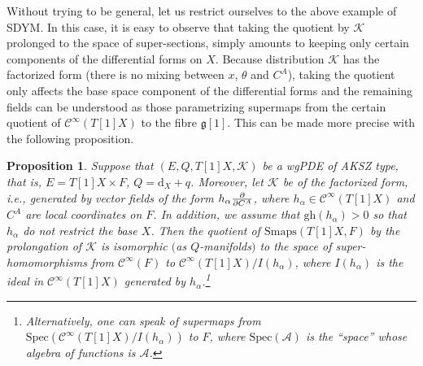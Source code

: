 \documentclass[pdftex]{sigma}
\numberwithin{equation}{section}
\newtheorem{Proposition}[Theorem]{Proposition}
\theoremstyle{definition}
\newcommand{\gh}[1]{\mathrm{gh}(#1)}
\newcommand{\dx}{\mathrm{d}_X}
\renewcommand{\d}{\partial}
\newcommand{\ffrac}[2]{\raisebox{.5pt}%
 {\footnotesize$\displaystyle\frac{#1}{#2}$}\kern1pt}
\newcommand{\dl}[1]{\mathchoice{\ffrac{\d}{\d #1}}{\frac{\d}{\d #1}}{\ffrac{\d}{\d #1}}{\ffrac{\d}{\d #1}}}
\newcommand{\Liealg}{\mathfrak}
\newcommand{\algg}{\Liealg{g}}
\newcommand{\algA}{\mathcal{A}}
\newcommand{\cC}{\mathcal{C}}
\def\cK{\mathcal{K}}
\begin{document}
Without trying to be general, let us restrict ourselves to the above example of SDYM. In this case, it is easy to observe that taking the quotient by $\cK$ prolonged to the space of super-sections, simply amounts to keeping only certain components of the differential forms on $X$. Because distribution $\cK$ has the factorized form \big(there is no mixing between $x$, $\theta$ and $C^A$\big), taking the quotient only affects the base space component of the differential forms and the remaining fields can be understood as those parametrizing supermaps from the certain quotient of $\cC^\infty(T[1]X)$ to the fibre $\algg[1]$. This can be made more precise with the following proposition.

\begin{Proposition}
Suppose that $(E,Q,T[1]X,\cK)$ be a wgPDE of AKSZ type, that is, $E=T[1]X\times F$, $Q=\dx+q$. Moreover, let $\cK$ be of the factorized form, i.e., generated by vector fields of the form
$h_\alpha\dl{C^A}$, where $h_\alpha\in \cC^\infty(T[1]X)$ and $C^A$ are local coordinates on $F$. In addition, we assume that $\gh{h_\alpha}>0$ so that $h_\alpha$ do not restrict the base $X$. Then the quotient of $\mathrm{Smaps}(T[1]X,F)$ by the prolongation of $\cK$ is isomorphic $($as $Q$-manifolds$)$ to the space of super-homomorphisms from $\cC^\infty(F)$ to $\cC^\infty(T[1]X)/I(h_\alpha)$, where $I(h_\alpha)$ is the ideal in
$\cC^\infty(T[1]X)$ generated by $h_\alpha$.\footnote{Alternatively,
one can speak of supermaps from $\mathrm{Spec}(\cC^\infty(T[1]X)/I(h_\alpha))$ to $F$, where $\mathrm{Spec}(\algA)$ is the ``space'' whose algebra of functions is $\algA$.}
\end{Proposition}
\end{document}
